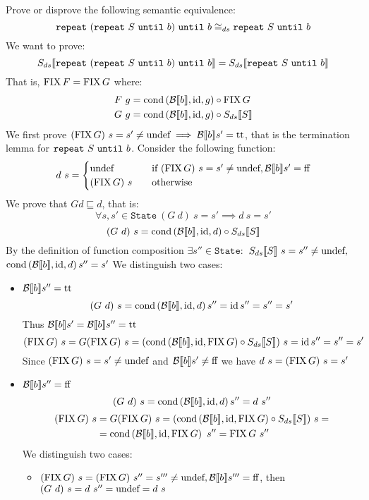 \begin{exercise}{
    Prove or disprove the following semantic equivalence:
    \[ \wrepeat{(\wrepeat{S}{b})}{b} \cong_{ds} \wrepeat{S}{b} \]
}
    We want to prove:
    \[ \Sds{\wrepeat{(\wrepeat{S}{b})}{b}} = \Sds{\wrepeat{S}{b}} \]
    That is, $\FIX F = \FIX G$ where:
    \begin{align*}
        F\ g &= \cond{\Bool{b}}{\id}{g} \circ \FIX G \\
        G\ g &= \cond{\Bool{b}}{\id}{g} \circ \Sds{S}
    \end{align*}
    We first prove $(\FIX G)\ s = s' \neq \undef \implies \Bool{b} s' = \text{tt}$, that is the termination lemma for $\wrepeat{S}{b}$.
    Consider the following function:
    \[
        d\ s = \begin{cases}
            \undef &\quad \text{if } (\FIX G)\ s = s' \neq \undef, \Bool{b} s' = \text{ff} \\
            (\FIX G)\ s &\quad \text{otherwise}
        \end{cases}
    \]
    We prove that $G d \sqsubseteq d$, that is:
    \[ \forall s, s' \in \texttt{State}\ (G\ d)\ s = s' \implies d\ s = s' \]
    \[ (G\ d)\ s = \cond{\Bool{b}}{\id}{d} \circ \Sds{S} \]
    By the definition of function composition $\exists s'' \in \texttt{State} :$ $\Sds{S}\ s = s'' \neq \undef,$ $\cond{\Bool{b}}{\id}{d} s'' = s'$
    We distinguish two cases:
    \begin{itemize}
        \item $\Bool{b} s'' = \text{tt}$
            \[ (G\ d)\ s = \cond{\Bool{b}}{\id}{d} s'' = \id s'' = s'' = s' \]
            Thus $\Bool{b} s' = \Bool{b} s'' = \text{tt}$
            \[ (\FIX G)\ s = G(\FIX G)\ s = (\cond{\Bool{b}}{\id}{\FIX G} \circ \Sds{S})\ s = \id s'' = s'' = s' \]
            Since $(\FIX G)\ s = s' \neq \undef$ and $\Bool{b} s' \neq \text{ff}$ we have $d\ s = (\FIX G)\ s = s'$
        \item $\Bool{b} s'' = \text{ff}$
            \[ (G\ d)\ s = \cond{\Bool{b}}{\id}{d} s'' = d\ s'' \]
            \begin{align*}
                (\FIX G)\ s &= G(\FIX G)\ s = (\cond{\Bool{b}}{\id}{\FIX G} \circ \Sds{S})\ s = \\
                &= \cond{\Bool{b}}{\id}{\FIX G}\ s'' = \FIX G\ s''
            \end{align*}
            We distinguish two cases:
            \begin{itemize}
                \item $(\FIX G)\ s = (\FIX G)\ s'' = s''' \neq \undef, \Bool{b} s''' = \text{ff}$, then $(G\ d)\ s = d\ s'' = \undef = d\ s$

\end{itemize}
\end{itemize}
\end{exercise}
